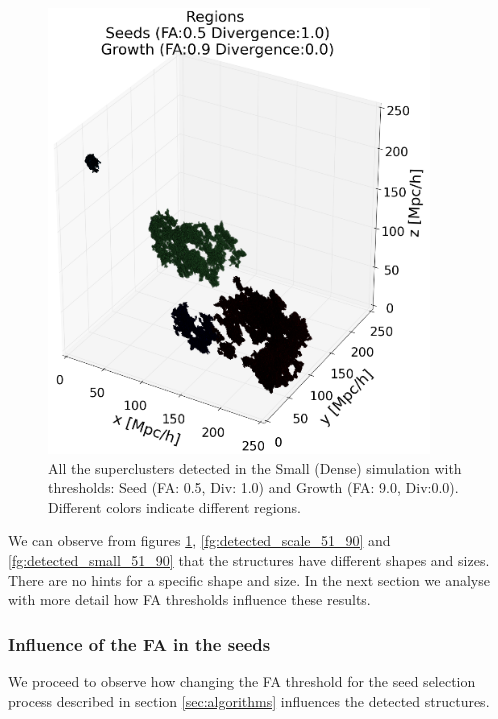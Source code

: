 \documentclass[12pt]{article}
\begin{document}
\begin{figure}[ht]
\begin{center}
  \includegraphics[width=0.9\textwidth]{groups/3d/seeds_FA_5/regions_nonoise_seeds_FA_05_Trace_10_search_FA_09_Trace_00_.png}
\caption{All the superclusters detected in the Small (Dense) simulation with thresholds: Seed (FA: 0.5, Div: 1.0) and Growth (FA: 9.0, Div:0.0). Different colors indicate different regions.}
\label{fg:detected_all_51_90}
\end{center}
\end{figure}
\FloatBarrier

\begin{par}
We can observe from figures
 \ref{fg:detected_all_51_90},
  \ref{fg:detected_scale_51_90} and
   \ref{fg:detected_small_51_90} that the
    structures have different shapes and sizes.
     There are no hints for a specific shape and
      size. In the next section we analyse with more detail how
       FA thresholds influence these results.
\end{par}

\subsubsection{Influence of the FA in the seeds}
\label{sec:infl_FA_seed}
\begin{par}
We proceed to observe how changing the FA threshold
 for the seed selection process described in
  section \ref{sec:algorithms} influences the
   detected structures. 
\end{par}
\end{document}
